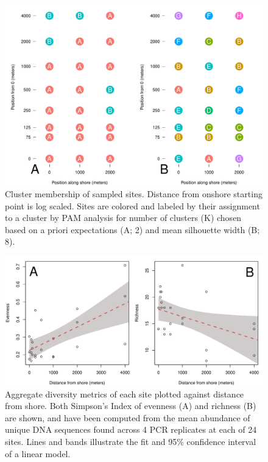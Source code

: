 \documentclass[11pt,letterpaper]{article} %
\begin{document}
\begin{figure}[H] %
  \centering
    \includegraphics[width=1\textwidth]{pam_in_space.pdf}
    \caption{
		Cluster membership of sampled sites.
		Distance from onshore starting point is log scaled. Sites are colored and labeled by their assignment to a cluster by PAM analysis for number of clusters (K) chosen based on a priori expectations (A; 2) and mean silhouette width (B; 8).
		}
  \label{pam_in_space}
\end{figure}


\begin{figure}[H] %
  \centering
    \includegraphics[width=1\textwidth]{diversity_distance.pdf}
    \caption{
		Aggregate diversity metrics of each site plotted against distance from shore.
		Both Simpson's Index of evenness (A) and richness (B) are shown, and have been computed from the mean abundance of unique DNA sequences found across 4 PCR replicates at each of 24 sites.
		Lines and bands illustrate the fit and 95\% confidence interval of a linear model.
		}
  \label{diversity_distance}
\end{figure}
\pagebreak
\end{document}
